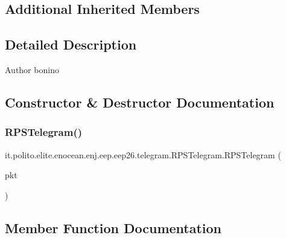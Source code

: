 \subsection*{Additional Inherited Members}


\subsection{Detailed Description}
\begin{DoxyAuthor}{Author}
bonino 
\end{DoxyAuthor}


\subsection{Constructor \& Destructor Documentation}
\hypertarget{classit_1_1polito_1_1elite_1_1enocean_1_1enj_1_1eep_1_1eep26_1_1telegram_1_1_r_p_s_telegram_addb93b678e78c0bd0cec292cb258df25}{}\label{classit_1_1polito_1_1elite_1_1enocean_1_1enj_1_1eep_1_1eep26_1_1telegram_1_1_r_p_s_telegram_addb93b678e78c0bd0cec292cb258df25} 
\subsubsection{\texorpdfstring{R\+P\+S\+Telegram()}{RPSTelegram()}}
{\footnotesize\ttfamily it.\+polito.\+elite.\+enocean.\+enj.\+eep.\+eep26.\+telegram.\+R\+P\+S\+Telegram.\+R\+P\+S\+Telegram (\begin{DoxyParamCaption}\item[{\hyperlink{classit_1_1polito_1_1elite_1_1enocean_1_1protocol_1_1serial_1_1v3_1_1network_1_1packet_1_1_e_s_p3_packet}{E\+S\+P3\+Packet}}]{pkt }\end{DoxyParamCaption})}



\subsection{Member Function Documentation}
\hypertarget{classit_1_1polito_1_1elite_1_1enocean_1_1enj_1_1eep_1_1eep26_1_1telegram_1_1_r_p_s_telegram_a6ed007a381dae3304bef7f3ead8e022f}{}\label{classit_1_1polito_1_1elite_1_1enocean_1_1enj_1_1eep_1_1eep26_1_1telegram_1_1_r_p_s_telegram_a6ed007a381dae3304bef7f3ead8e022f} 
